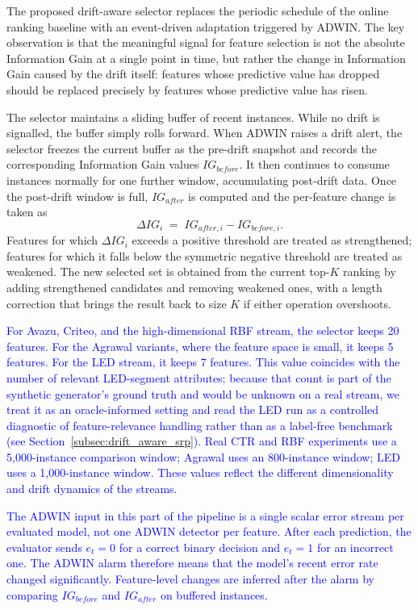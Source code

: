 \documentclass[12pt]{article}
\newcommand{\new}[1]{\textcolor{blue}{#1}}
\begin{document}
The proposed drift-aware selector replaces the periodic schedule of the online
ranking baseline with an event-driven adaptation triggered by ADWIN. The key
observation is that the meaningful signal for feature selection is not the
absolute Information Gain at a single point in time, but rather the change in
Information Gain caused by the drift itself: features whose predictive value
has dropped should be replaced precisely by features whose predictive value
has risen.

The selector maintains a sliding buffer of recent instances. While no drift
is signalled, the buffer simply rolls forward. When ADWIN raises a drift
alert, the selector freezes the current buffer as the pre-drift snapshot and
records the corresponding Information Gain values $IG_{before}$. It then
continues to consume instances normally for one further window, accumulating
post-drift data. Once the post-drift window is full, $IG_{after}$ is computed
and the per-feature change is taken as
\[
\Delta IG_i \;=\; IG_{after,i} - IG_{before,i}.
\]
Features for which $\Delta IG_i$ exceeds a positive threshold are treated as
strengthened; features for which it falls below the symmetric negative
threshold are treated as weakened. The new selected set is obtained from the
current top-$K$ ranking by adding strengthened candidates and removing
weakened ones, with a length correction that brings the result back to size
$K$ if either operation overshoots.

\new{For Avazu, Criteo, and the high-dimensional RBF stream, the selector
keeps 20 features. For the Agrawal variants, where the feature space is small,
it keeps 5 features. For the LED stream, it keeps 7 features. This value
coincides with the number of relevant LED-segment attributes; because that count
is part of the synthetic generator's ground truth and would be unknown on a real
stream, we treat it as an oracle-informed setting and read the LED run as a
controlled diagnostic of feature-relevance handling rather than as a label-free
benchmark (see Section~\ref{subsec:drift_aware_srp}). Real CTR and RBF experiments
use a 5,000-instance comparison window; Agrawal uses an 800-instance window;
LED uses a 1,000-instance window. These values reflect the different
dimensionality and drift dynamics of the streams.}

\new{The ADWIN input in this part of the pipeline is a single scalar error
stream per evaluated model, not one ADWIN detector per feature. After each
prediction, the evaluator sends $e_t=0$ for a correct binary decision and
$e_t=1$ for an incorrect one. The ADWIN alarm therefore means that the model's
recent error rate changed significantly. Feature-level changes are inferred
after the alarm by comparing $IG_{before}$ and $IG_{after}$ on buffered
instances.}
\end{document}
